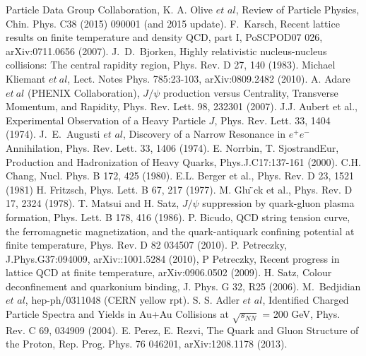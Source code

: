 \begin{thebibliography}{4}%
 Particle Data Group Collaboration, K. A. Olive $et$ $al$, Review of Particle Physics, Chin. Phys. C38 (2015) 090001 (and 2015 update).
 F.~Karsch, Recent lattice results on finite temperature and density QCD, part I, PoSCPOD07 026, arXiv:0711.0656 (2007).
 J.~D.~Bjorken, Highly relativistic nucleus-nucleus collisions: The central rapidity region, Phys. Rev. D 27, 140 (1983).
 Michael Kliemant $et~al$, Lect. Notes Phys. 785:23-103, arXiv:0809.2482 (2010). 
 A. Adare $et~al$ (PHENIX Collaboration), $J/\psi$ production versus Centrality, Transverse Momentum, and Rapidity, Phys. Rev. Lett. 98, 232301 (2007).  
 J.J. Aubert et al., Experimental Observation of a Heavy Particle $J$, Phys. Rev. Lett. 33, 1404 (1974).
 J.~E.~Augusti $et$ $al$, Discovery of a Narrow Resonance in $e^{+}e^{-}$ Annihilation, Phys. Rev. Lett. 33, 1406 (1974).
 E. Norrbin, T. SjostrandEur, Production and Hadronization of Heavy Quarks, Phys.J.C17:137-161 (2000). 
 C.H. Chang, Nucl. Phys. B 172, 425 (1980).
 E.L. Berger et al., Phys. Rev. D 23, 1521 (1981)
 H. Fritzsch, Phys. Lett. B 67, 217 (1977).
 M. Glu ̈ck et al., Phys. Rev. D 17, 2324 (1978).
 T. Matsui and H. Satz, $J/\psi$ suppression by quark-gluon plasma formation, Phys. Lett. B 178, 416 (1986).
 P. Bicudo, QCD string tension curve, the ferromagnetic magnetization, and the quark-antiquark confining potential at finite temperature, Phys. Rev. D 82 034507 (2010).
 P. Petreczky, J.Phys.G37:094009, arXiv::1001.5284 (2010), P Petreczky, Recent progress in lattice QCD at finite temperature, arXiv:0906.0502 (2009).
 H. Satz, Colour deconfinement and quarkonium binding, J. Phys. G 32, R25 (2006).
 M.~Bedjidian $et$ $al$, hep-ph/0311048 (CERN yellow rpt).
 S. S. Adler $et$ $al$, Identified Charged Particle Spectra and Yields in Au+Au Collisions at $\sqrt{s_{NN}}$ = 200 GeV, Phys. Rev. C 69, 034909 (2004). 
 E. Perez, E. Rezvi, The Quark and Gluon Structure of the Proton, Rep. Prog. Phys. 76 046201, arXiv:1208.1178 (2013).

\end{thebibliography}
